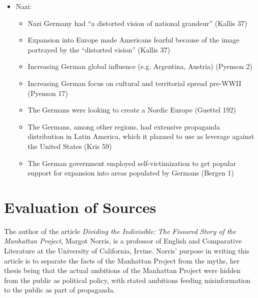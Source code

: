 \documentclass[a4paper]{article}
\begin{document}
\begin{itemize}
\begin{itemize}
\begin{itemize}
                \end{itemize}
                \item Nazi:
                \begin{itemize}
                    \item Nazi Germany had ``a distorted vision of national grandeur'' (Kallis 37)
                    \item Expansion into Europe made Americans fearful because of the image portrayed by the ``distorted vision'' (Kallis 37)
                    \item Increasing German global influence (e.g. Argentina, Austria) (Pyenson 2)
                    \item Increasing German focus on cultural and territorial spread pre-WWII (Pyenson 17)
                    \item The Germans were looking to create a Nordic Europe (Guettel 192)
                    \item The Germans, among other regions, had extensive propaganda distribution in Latin America, which it planned to use as leverage against the United States (Kris 59)
                    \item The German government employed self-victimization to get popular support for expansion into areas populated by Germans (Bergen 1)
                \end{itemize}
            \end{itemize}
        \end{itemize}
    \section{Evaluation of Sources} %
        The author of the article \textit{Dividing the Indivisible: The Fissured Story of the Manhattan Project},
        Margot Norris, is a professor of English and Comparative Literature at the University of California, Irvine.
        Norris' purpose in writing this article is to separate the facts of the Manhattan Project from the myths,
        her thesis being that the actual ambitions of the Manhattan Project were hidden from the public as political
        policy, with stated ambitions feeding misinformation to the public as part of propaganda. 
\end{document}
